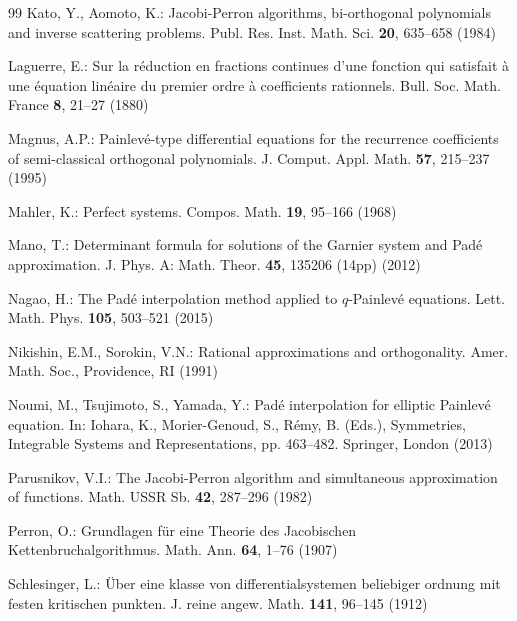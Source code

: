 \documentclass[12pt]{article}
\numberwithin{equation}{section}
\begin{document}
\begin{thebibliography}{99}
Kato, Y., 
Aomoto, K.:
Jacobi-Perron algorithms, bi-orthogonal
polynomials and inverse scattering
problems.
Publ. Res. Inst. Math. Sci. 
{\bf 20}, 635--658 (1984)


Laguerre, E.:
Sur la r\'eduction en fractions continues d'une fonction qui satisfait
\`a
une \'equation lin\'eaire du premier ordre 
\`a
coefficients rationnels.
Bull. Soc. Math. France 
{\bf 8}, 21--27
 (1880) 



Magnus, A.P.:
Painlev\'e-type differential equations for the recurrence coefficients of semi-classical orthogonal polynomials.
J. Comput. Appl. Math. {\bf 57}, 
 215--237
 (1995)


Mahler, K.:
Perfect systems.
Compos. Math. {\bf 19},  95--166 (1968)


Mano, T.:
Determinant formula for solutions of the Garnier system and Pad\'e approximation.
J. Phys. A: Math. Theor. 
{\bf 45}, 135206 (14pp)
(2012)





Nagao,  H.:
The Pad\'e interpolation method applied to $q$-Painlev\'e equations.
Lett. Math. Phys.
{\bf 105},
503--521 (2015)



Nikishin, E.M.,
Sorokin,  V.N.:
Rational approximations and orthogonality.
Amer. Math. Soc.,  Providence, RI (1991)


Noumi,  M.,
Tsujimoto, S.,
Yamada,  Y.:
Pad\'e interpolation for elliptic Painlev\'e equation.
In:  Iohara, K.,  
Morier-Genoud, S., 
R\'emy, B.
(Eds.),
Symmetries, Integrable Systems and Representations,
pp. 463--482.
Springer, London (2013)


Parusnikov, V.I.:
The Jacobi-Perron algorithm and simultaneous approximation of functions.
 Math. USSR Sb. {\bf 42}, 
 287--296 (1982)
 
Perron, O.:
Grundlagen f\"ur eine Theorie des Jacobischen Kettenbruchalgorithmus.
Math. Ann. {\bf 64}, 
1--76 (1907) 

 
Schlesinger,  L.:
\"Uber eine klasse von 
differentialsystemen beliebiger ordnung mit festen kritischen punkten.
J.  reine  angew.  Math. 
{\bf 141}, 96--145 (1912)



\end{thebibliography}
\end{document}
